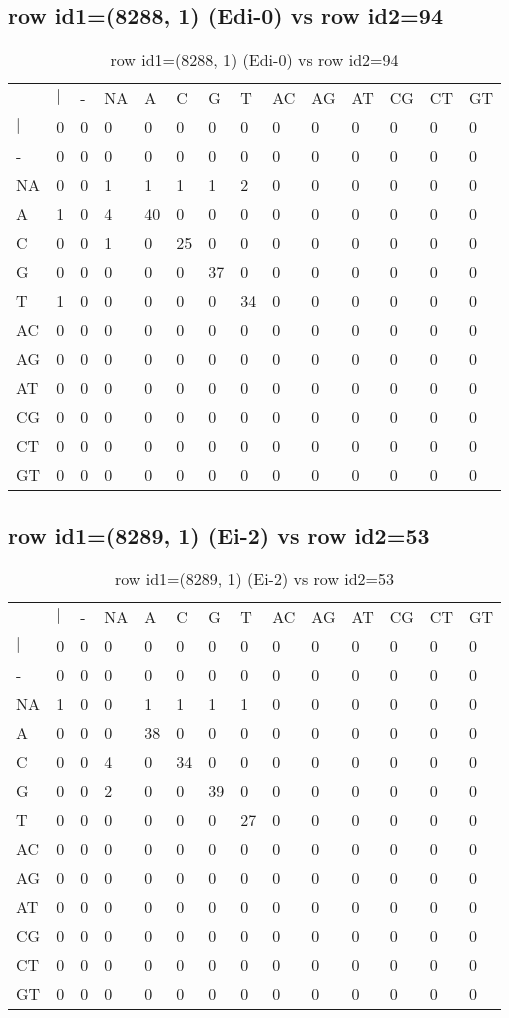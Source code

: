 \subsection{row id1=(8288, 1) (Edi-0) vs row id2=94}
\begin{center}
\begin{longtable}{|l|l|l|l|l|l|l|l|l|l|l|l|l|l|}
\caption{row id1=(8288, 1) (Edi-0) vs row id2=94} \label{table_dm254}\\
\hline
\\
\hline
&$|$&-&NA&A&C&G&T&AC&AG&AT&CG&CT&GT\\
$|$&0&0&0&0&0&0&0&0&0&0&0&0&0\\
-&0&0&0&0&0&0&0&0&0&0&0&0&0\\
NA&0&0&1&1&1&1&2&0&0&0&0&0&0\\
A&1&0&4&40&0&0&0&0&0&0&0&0&0\\
C&0&0&1&0&25&0&0&0&0&0&0&0&0\\
G&0&0&0&0&0&37&0&0&0&0&0&0&0\\
T&1&0&0&0&0&0&34&0&0&0&0&0&0\\
AC&0&0&0&0&0&0&0&0&0&0&0&0&0\\
AG&0&0&0&0&0&0&0&0&0&0&0&0&0\\
AT&0&0&0&0&0&0&0&0&0&0&0&0&0\\
CG&0&0&0&0&0&0&0&0&0&0&0&0&0\\
CT&0&0&0&0&0&0&0&0&0&0&0&0&0\\
GT&0&0&0&0&0&0&0&0&0&0&0&0&0\\
\hline
\end{longtable}
\end{center}

\subsection{row id1=(8289, 1) (Ei-2) vs row id2=53}
\begin{center}
\begin{longtable}{|l|l|l|l|l|l|l|l|l|l|l|l|l|l|}
\caption{row id1=(8289, 1) (Ei-2) vs row id2=53} \label{table_dm256}\\
\hline
\\
\hline
&$|$&-&NA&A&C&G&T&AC&AG&AT&CG&CT&GT\\
$|$&0&0&0&0&0&0&0&0&0&0&0&0&0\\
-&0&0&0&0&0&0&0&0&0&0&0&0&0\\
NA&1&0&0&1&1&1&1&0&0&0&0&0&0\\
A&0&0&0&38&0&0&0&0&0&0&0&0&0\\
C&0&0&4&0&34&0&0&0&0&0&0&0&0\\
G&0&0&2&0&0&39&0&0&0&0&0&0&0\\
T&0&0&0&0&0&0&27&0&0&0&0&0&0\\
AC&0&0&0&0&0&0&0&0&0&0&0&0&0\\
AG&0&0&0&0&0&0&0&0&0&0&0&0&0\\
AT&0&0&0&0&0&0&0&0&0&0&0&0&0\\
CG&0&0&0&0&0&0&0&0&0&0&0&0&0\\
CT&0&0&0&0&0&0&0&0&0&0&0&0&0\\
GT&0&0&0&0&0&0&0&0&0&0&0&0&0\\
\hline
\end{longtable}
\end{center}

